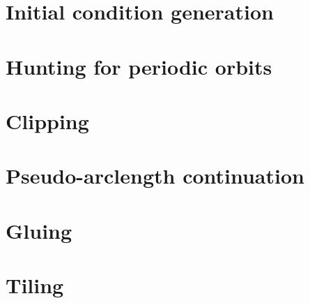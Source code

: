 \section{Initial condition generation}

\section{Hunting for periodic orbits}

\section{Clipping}

\section{Pseudo-arclength continuation}

\section{Gluing}

\section{Tiling}

